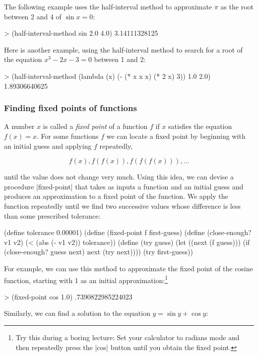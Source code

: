 The following example uses the half-interval method to approximate $\pi$
as the root between 2 and 4 of $\sin x = 0$:

\begin{schemedisplay}
> (half-interval-method sin 2.0 4.0)
3.14111328125
\end{schemedisplay}

Here is another example, using the half-interval method
to search for a root of the equation $x^3 - 2x - 3 = 0$
between 1 and 2:

\begin{schemedisplay}
> (half-interval-method (lambda (x) (- (* x x x) (* 2 x) 3))
                        1.0
                        2.0)
1.89306640625
\end{schemedisplay}


\subsubsection*{Finding fixed points of functions}


A number $x$ is called a \textit{fixed point} of a function $f$ if $x$
satisfies the equation $f(x) = x$.  For some functions $f$ we
can locate a fixed point by beginning with an initial guess and
applying $f$ repeatedly,

\[
f(x), f(f(x)), f(f(f(x))), \ldots
\]

until the value does not change very much.  Using this idea, we can
devise a procedure \scheme|fixed-point| that takes as inputs a function
and an initial guess and produces an approximation to a fixed point of
the function.  We apply the function repeatedly until we find two
successive values whose difference is less than some prescribed
tolerance:


\begin{schemedisplay}
(define tolerance 0.00001)
(define (fixed-point f first-guess)
  (define (close-enough? v1 v2)
    (< (abs (- v1 v2)) tolerance))
  (define (try guess)
    (let ((next (f guess)))
      (if (close-enough? guess next)
          next
          (try next))))
  (try first-guess))
\end{schemedisplay}
For example, we can use this method to approximate the fixed point of
the cosine function, starting with 1 as an initial
approximation:\footnote{Try this during a boring lecture: Set your
  calculator to radians mode and then repeatedly press the
  \scheme|cos| button until you obtain the fixed point.}


\begin{schemedisplay}
> (fixed-point cos 1.0)
.7390822985224023
\end{schemedisplay}
Similarly, we can find a solution to the equation
$y = \sin y + \cos y$: 

